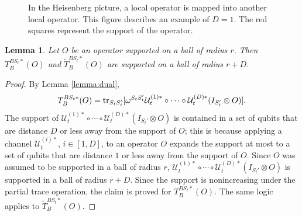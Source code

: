 \documentclass[prx,aps,amsmath,amssymb,floatfix,superscriptaddress,11pt,tightenlines,longbibliography,onecolumn,notitlepage]{revtex4-1}
\newcommand{\Tr}{\textnormal{tr}}
\newtheorem{lem}{Lemma}
\begin{document}
\begin{figure}[h]
\caption{In the Heisenberg picture, a local operator is mapped into another local operator. This figure describes an example of $D=1$. The red squares represent the support of the operator. \label{fig:locality_preserving}}
\end{figure}



\begin{lem}\label{lemma:locality_preserving}
  Let $O$ be an operator supported on a ball of radius $r$. Then $T_B^{BS_t*}(O)$ and $\tilde{T}_B^{BS_t*}(O)$ are supported on a ball of radius $r+D$.
\end{lem}
\begin{proof}
  By Lemma \ref{lemma:dual},
  \begin{equation}
    \begin{aligned}
      T_B^{BS_t*}(O) = \Tr_{S_tS_t'}[\omega^{S_tS_t'} \mathcal{U}_t^{(1)*}\circ \cdots \circ \mathcal{U}_t^{(D)*}(I_{S_t'} \otimes O)].
    \end{aligned}
  \end{equation}
  The support of $ \mathcal{U}_t^{(1)*}\circ \cdots \circ \mathcal{U}_t^{(D)*}(I_{S_t'} \otimes O)$ is contained in a set of qubits that are distance $D$ or less away from the support of $O$; this is because applying a channel $\mathcal{U}_t^{(i)*}$, $i\in [1,D]$, to an operator $O$ expands the support at most to a set of qubits that are distance $1$ or less away from the support of $O$. Since $O$ was assumed to be supported in a ball of radius $r$, $ \mathcal{U}_t^{(1)*}\circ \cdots \circ \mathcal{U}_t^{(D)*}(I_{S_t'} \otimes O)$ is supported in a ball of radius $r+D$. Since the support is nonincreasing under the partial trace operation, the claim is proved for $T_B^{BS_t*}(O)$. The same logic applies to $\tilde{T}_B^{BS_t*}(O)$.
\end{proof}
\end{document}
